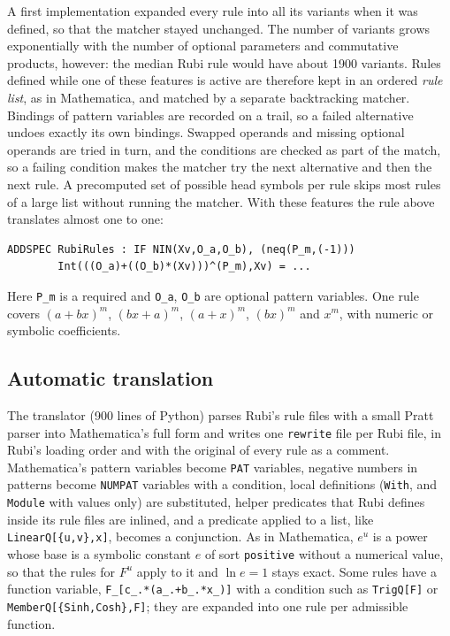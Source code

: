 \documentclass[11pt,a4paper]{article}
\begin{document}
A first implementation expanded every rule into all its variants when it
was defined, so that the matcher stayed unchanged. The number of variants
grows exponentially with the number of optional parameters and commutative
products, however: the median Rubi rule would have about 1900 variants.
Rules defined while one of these features is active are therefore kept in
an ordered \emph{rule list}, as in Mathematica, and matched by a separate
backtracking matcher. Bindings of pattern variables are recorded on a trail,
so a failed alternative undoes exactly its own bindings. Swapped operands
and missing optional operands are tried in turn, and the conditions are
checked as part of the match, so a failing condition makes the matcher try
the next alternative and then the next rule. A precomputed set of possible
head symbols per rule skips most rules of a large list without running the
matcher. With these features the rule above translates almost one to one:

\begin{lstlisting}
ADDSPEC RubiRules : IF NIN(Xv,O_a,O_b), (neq(P_m,(-1)))
        Int(((O_a)+((O_b)*(Xv)))^(P_m),Xv) = ...
\end{lstlisting}

Here \texttt{P\_m} is a required and \texttt{O\_a}, \texttt{O\_b} are
optional pattern variables. One rule covers $(a+bx)^m$, $(bx+a)^m$, $(a+x)^m$,
$(bx)^m$ and $x^m$, with numeric or symbolic coefficients.

\subsection{Automatic translation}

The translator (900 lines of Python) parses Rubi's rule files with a small
Pratt parser into Mathematica's full form and writes one \texttt{rewrite}
file per Rubi file, in Rubi's loading order and with the original of every
rule as a comment. Mathematica's pattern variables become \texttt{PAT} variables, negative
numbers in patterns become \texttt{NUMPAT} variables with a condition, local
definitions (\texttt{With}, and \texttt{Module} with values only) are
substituted, helper predicates that Rubi defines inside its rule files are
inlined, and a predicate applied to a list, like \texttt{LinearQ[\{u,v\},x]},
becomes a conjunction. As in Mathematica, $e^u$ is a power whose base is a
symbolic constant $e$ of sort \texttt{positive} without a numerical value,
so that the rules for $F^u$ apply to it and $\ln e=1$ stays exact. Some
rules have a
function variable, \texttt{F\_[c\_.*(a\_.+b\_.*x\_)]} with a condition such
as \texttt{TrigQ[F]} or \texttt{MemberQ[\{Sinh,Cosh\},F]}; they are expanded
into one rule per admissible function.
\end{document}
